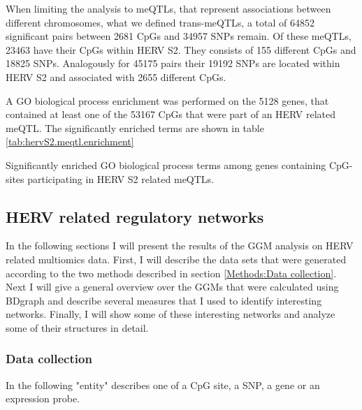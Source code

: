 \documentclass[a4paper,12pt,twoside,openright]{article}
\begin{document}
When limiting the analysis to meQTLs, that represent associations between different chromosomes, what we defined trans-meQTLs, a total of 64852 significant pairs between 2681 CpGs and 34957 SNPs remain. Of these meQTLs, 23463 have their CpGs within HERV S2. They consists of 155 different CpGs and 18825 SNPs. Analogously for 45175 pairs their 19192 SNPs are located within HERV S2 and associated with 2655 different CpGs.

A GO biological process enrichment was performed on the 5128 genes, that contained at least one of the 53167 CpGs that were part of an HERV related meQTL. The significantly enriched terms are shown in table \ref{tab:hervS2.meqtl.enrichment}

\begin{table}[h!]
  \begin{center}
  \end{center}        
	\caption{Significantly enriched GO biological process terms among genes containing CpG-sites participating in HERV S2 related meQTLs.}
	\label{tab:hervS2.meqtl.enrichment}
\end{table}

\subsection{HERV related regulatory networks}
\label{Results:HERV related regulatory networks}
In the following sections I will present the results of the GGM analysis on HERV related multiomics data. First, I will describe the data sets that were generated according to the two methods described in section \ref{Methods:Data collection}. Next I will give a general overview over the GGMs that were calculated using BDgraph and describe several measures that I used to identify interesting networks. Finally, I will show some of these interesting networks and analyze some of their structures in detail.

\subsubsection{Data collection}
\label{Results:Data collection}
In the following "entity" describes one of a CpG site, a SNP, a gene or an expression probe.
\end{document}
